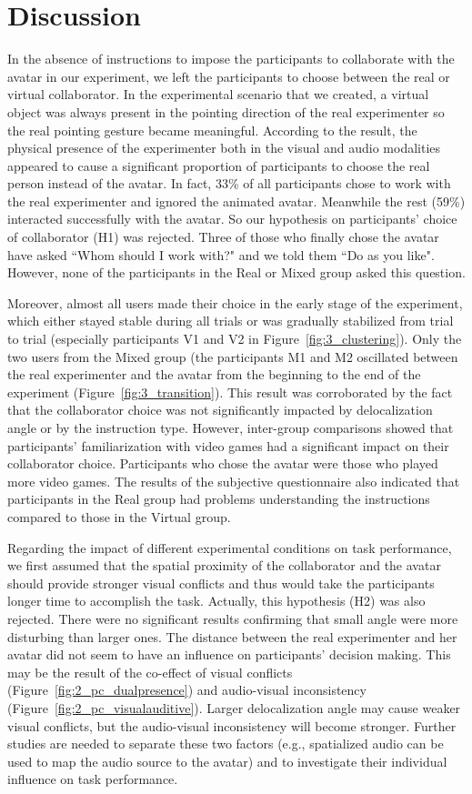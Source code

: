 \section{Discussion}
In the absence of instructions to impose the participants to collaborate with the avatar in our experiment, we left the participants to choose between the real or virtual collaborator. In the experimental scenario that we created, a virtual object was always present in the pointing direction of the real experimenter so the real pointing gesture became meaningful. According to the result, the physical presence of the experimenter both in the visual and audio modalities appeared to cause a significant proportion of participants to choose the real person instead of the avatar. In fact, 33\% of all participants chose to work with the real experimenter and ignored the animated avatar. Meanwhile the rest (59\%) interacted successfully with the avatar. So our hypothesis on participants' choice of collaborator (H1) was rejected. Three of those who finally chose the avatar have asked ``Whom should I work with?" and we told them ``Do as you like". However, none of the participants in the Real or Mixed group asked this question.

Moreover, almost all users made their choice in the early stage of the experiment, which either stayed stable during all trials or was gradually stabilized from trial to trial (especially participants V1 and V2 in Figure~\ref{fig:3_clustering}). Only the two users from the Mixed group (the participants M1 and M2 oscillated between the real experimenter and the avatar from the beginning to the end of the experiment (Figure~\ref{fig:3_transition}). This result was corroborated by the fact that the collaborator choice was not significantly impacted by delocalization angle or by the instruction type. However, inter-group comparisons showed that participants' familiarization with video games had a significant impact on their collaborator choice. Participants who chose the avatar were those who played more video games. The results of the subjective questionnaire also indicated that participants in the Real group had problems understanding the instructions compared to those in the Virtual group.

Regarding the impact of different experimental conditions on task performance, we first assumed that the spatial proximity of the collaborator and the avatar should provide stronger visual conflicts and thus would take the participants longer time to accomplish the task. Actually, this hypothesis (H2) was also rejected. There were no significant results confirming that small angle were more disturbing than larger ones. The distance between the real experimenter and her avatar did not seem to have an influence on participants' decision making. This may be the result of the co-effect of visual conflicts (Figure~\ref{fig:2_pc_dualpresence}) and audio-visual inconsistency (Figure~\ref{fig:2_pc_visualauditive}). Larger delocalization angle may cause weaker visual conflicts, but the audio-visual inconsistency will become stronger. Further studies are needed to separate these two factors (e.g., spatialized audio can be used to map the audio source to the avatar) and to investigate their individual influence on task performance.

